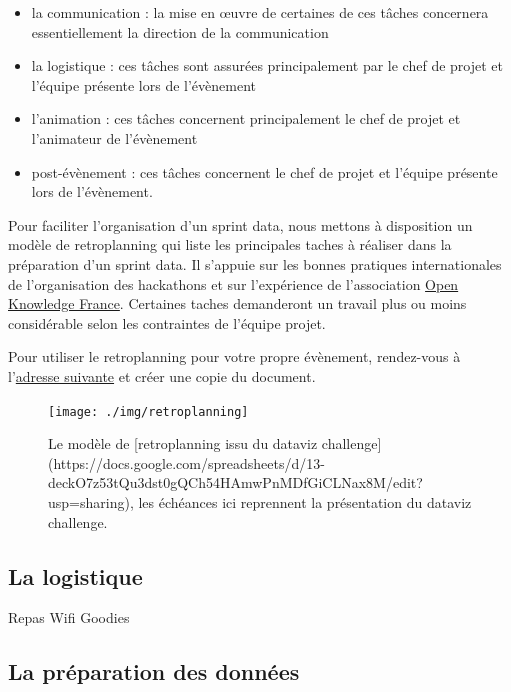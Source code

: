\documentclass[]{book}
\begin{document}
\begin{itemize}
\item
  la communication : la mise en œuvre de certaines de ces tâches
  concernera essentiellement la direction de la communication
\item
  la logistique : ces tâches sont assurées principalement par le chef de
  projet et l'équipe présente lors de l'évènement
\item
  l'animation : ces tâches concernent principalement le chef de projet
  et l'animateur de l'évènement
\item
  post-évènement : ces tâches concernent le chef de projet et l'équipe
  présente lors de l'évènement.
\end{itemize}

Pour faciliter l'organisation d'un sprint data, nous mettons à
disposition un modèle de retroplanning qui liste les principales taches
à réaliser dans la préparation d'un sprint data. Il s'appuie sur les
bonnes pratiques internationales de l'organisation des hackathons et sur
l'expérience de l'association \href{okfn.fr}{Open Knowledge France}.
Certaines taches demanderont un travail plus ou moins considérable selon
les contraintes de l'équipe projet.

Pour utiliser le retroplanning pour votre propre évènement, rendez-vous
à
l'\href{https://docs.google.com/spreadsheets/d/13-deckO7z53tQu3dst0gQCh54HAmwPnMDfGiCLNax8M/edit?usp=sharing}{adresse
suivante} et créer une copie du document.

\begin{figure}

{\centering \texttt{[image: ./img/retroplanning]} 

}

\caption{Le modèle de [retroplanning issu du dataviz challenge](https://docs.google.com/spreadsheets/d/13-deckO7z53tQu3dst0gQCh54HAmwPnMDfGiCLNax8M/edit?usp=sharing), les échéances ici reprennent la présentation du dataviz challenge.}\label{fig:unnamed-chunk-14}
\end{figure}

\subsection{La logistique}\label{la-logistique}

Repas Wifi Goodies

\subsection{La préparation des
données}\label{la-preparation-des-donnees}
\end{document}
